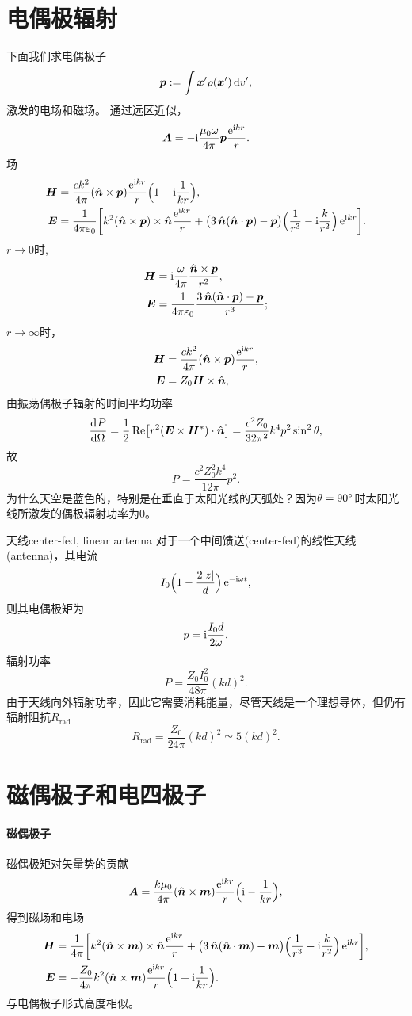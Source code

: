\section{电偶极辐射}
下面我们求电偶极子
\[
    \bm p:=\int\bm x'\rho(\bm x')\mathop{}\!\mathrm{d} v',
\]
激发的电场和磁场。
通过远区近似，
\[
    \bm A=-\mathrm{i}\frac{\mu_0\omega}{4\pi}\bm p\frac{\mathop{}\!\mathrm{e}^{\mathrm{i} kr}}r.
\]
场
\begin{align*}
    \bm H&=\frac{ck^2}{4\pi}(\uvec n\times\bm p)\frac{\e{\i kr}}r\Bigkh{1+\i\frac1{kr}},\\
    \bm E&=\frac1{4\pi\varepsilon_0}\biggfkh{k^2(\uvec n\times\bm p)\times\uvec n\frac{\e{\i kr}}r+\bigkh{3\uvec n(\uvec n\cdot\bm p)-\bm p}\Bigkh{\frac1{r^3}-\i\frac{k}{r^2}}\e{\i kr}}.
\end{align*}
$r\to 0$时,
\begin{align*}
    \bm H&=\mathrm{i}\frac{\omega}{4\pi}\frac{\mathop{}\!\hat{\bm{n}}\times\bm p}{r^2},\\
    \bm E&=\frac1{4\pi\varepsilon_0}\frac{3\mathop{}\!\hat{\bm{n}}(\mathop{}\!\hat{\bm{n}}\cdot\bm p)-\bm p}{r^3};
\end{align*}
$r\to\infty$时，
\begin{align*}
    \bm H&=\frac{ck^2}{4\pi}(\mathop{}\!\hat{\bm{n}}\times\bm p)\frac{\mathop{}\!\mathrm{e}^{\mathrm{i} kr}}r,\\
    \bm E&=Z_0\bm H\times\mathop{}\!\hat{\bm{n}},
\end{align*}
由振荡偶极子辐射的时间平均功率
\[
    \frac{\mathrm{d}^{{}}P}{\mathrm{d}{\Omega}^{{}}}=\frac12\operatorname{Re}\bigl[r^2(\bm E\times\bm H^\ast)\cdot\mathop{}\!\hat{\bm{n}}\bigr]=\frac{c^2Z_0}{32\pi^2}k^4p^2\sin^2\theta,
\]
故
\begin{equation}
    P=\frac{c^2Z_0^2k^4}{12\pi}p^2.
\end{equation}
为什么天空是蓝色的，特别是在垂直于太阳光线的天弧处？因为$\theta=90^\circ$时太阳光线所激发的偶极辐射功率为0。
\begin{example}{天线}{center-fed, linear antenna}
    对于一个中间馈送(center-fed)的线性天线(antenna)，其电流
    \[
        I_0\Bigl(1-\frac{2|z|}d\Bigr)\mathop{}\!\mathrm{e}^{-\mathrm{i}\omega t},
    \]
    则其电偶极矩为
    \[
        p=\mathrm{i}\frac{I_0d}{2\omega},
    \]
    辐射功率
    \[
        P=\frac{Z_0I_0^2}{48\pi}(kd)^2.
    \]
    由于天线向外辐射功率，因此它需要消耗能量，尽管天线是一个理想导体，但仍有辐射阻抗$R_\text{rad}$
    \[
        R_\text{rad}=\frac{Z_0}{24\pi}(kd)^2\simeq 5(kd)^2.
    \]
\end{example}
\section{磁偶极子和电四极子}
\paragraph{磁偶极子}
磁偶极矩对矢量势的贡献
\[
    \bm A=\frac{k\mu_0}{4\pi}(\mathop{}\!\hat{\bm{n}}\times\bm m)\frac{\mathop{}\!\mathrm{e}^{\mathrm{i} kr}}r\Bigl(\mathrm{i}-\frac1{kr}\Bigr),
\]
得到磁场和电场
\begin{align*}
    \bm H&=\frac1{4\pi}\biggfkh{k^2(\uvec n\times\bm m)\times\uvec n\frac{\e{\i kr}}r+\bigkh{3\uvec n(\uvec n\cdot\bm m)-\bm m}\Bigkh{\frac1{r^3}-\i\frac{k}{r^2}}\e{\i kr}},\\
    \bm E&=-\frac{Z_0}{4\pi}k^2(\uvec n\times\bm m)\frac{\e{\i kr}}r\Bigkh{1+\i\frac1{ kr}}.
\end{align*}
与电偶极子形式高度相似。
